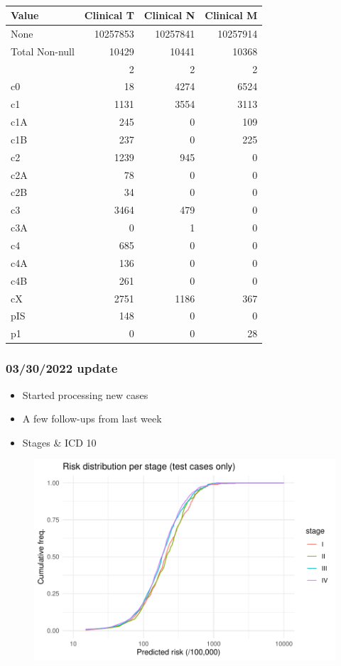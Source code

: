 \documentclass[12pt]{article}
\begin{document}
\begin{table}[ht]
\centering
\caption{}
\begin{tabular}{lrrr}
  \toprule
Value & Clinical T & Clinical N & Clinical M \\ 
  \midrule
None & 10257853 & 10257841 & 10257914 \\ 
Total Non-null & 10429 & 10441 & 10368 \\ 
\addlinespace
88 & 2 & 2 & 2 \\
\addlinespace 
c0 & 18 & 4274 & 6524 \\ 
c1 & 1131 & 3554 & 3113 \\ 
c1A & 245 & 0 & 109 \\ 
c1B & 237 & 0 & 225 \\ 
c2 & 1239 & 945 & 0 \\ 
c2A & 78 & 0 & 0 \\ 
c2B & 34 & 0 & 0 \\ 
c3 & 3464 & 479 & 0 \\ 
c3A & 0 & 1 & 0 \\ 
c4 & 685 & 0 & 0 \\ 
c4A & 136 & 0 & 0 \\ 
c4B & 261 & 0 & 0 \\ 
\addlinespace
cX & 2751 & 1186 & 367 \\ 
pIS & 148 & 0 & 0 \\ 
p1 & 0 & 0 & 28 \\ 
   \bottomrule
\end{tabular}
\end{table}





\pagebreak
\subsubsection*{03/30/2022 update}

\begin{itemize}
	\item Started processing new cases
	\item A few follow-ups from last week
	\item Stages \& ICD 10
\end{itemize}


\begin{figure}[h]
\centering
\includegraphics[width=\textwidth]{figures/risk_stage.pdf}
\end{figure}
\end{document}
